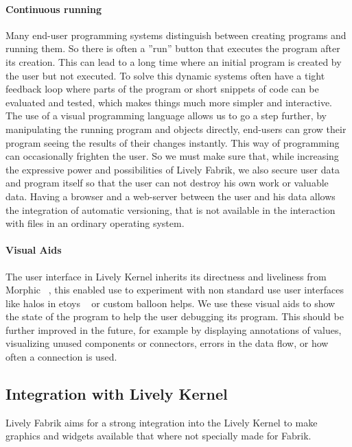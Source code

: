 \documentclass[pdftex, times, 10pt, twocolumn]{article}
\begin{document}
\paragraph{Continuous running}
Many end-user programming systems distinguish between creating programs and running them. So there is often a ''run'' button that executes the program after its creation. This can lead to a long time where an initial program is created by the user but not executed. To solve this dynamic systems often have a tight feedback loop where parts of the program or short snippets of code can be evaluated and tested, which makes things much more simpler and interactive.  The use of a visual programming language allows us to go a step further, by manipulating the running program and objects directly, end-users can grow their program seeing the results of their changes instantly. This way of programming can occasionally frighten the user. So we must make sure that, while increasing the expressive power and possibilities of Lively Fabrik, we also secure user data and program itself so that the user can not destroy his own work or valuable data. Having a browser and a web-server between the user and his data allows the integration of automatic versioning, that is not available in the interaction with files in an ordinary operating system.  



\paragraph{Visual Aids}
The user interface in Lively Kernel inherits its directness and liveliness from Morphic ~\cite{Maloney1995DLM}, this enabled use to experiment with non standard use user interfaces like halos in etoys  ~\cite{Kay2005SEA} or custom balloon helps. We use these  visual aids to show the state of the program to help the user debugging its program. This should be further improved in the future, for example by displaying annotations of values, visualizing unused components or connectors, errors in the data flow, or how often a connection is used. 

\subsection{Integration with Lively Kernel}
Lively Fabrik aims for a strong integration into the Lively Kernel to make graphics and widgets available that where not specially made for Fabrik.  
\end{document}
